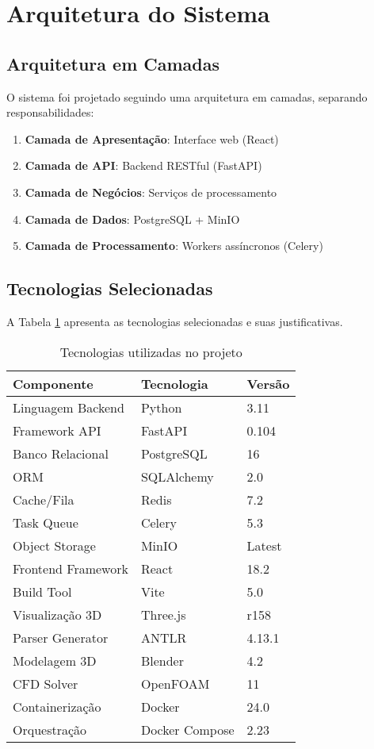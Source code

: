 \section{Arquitetura do Sistema}

\subsection{Arquitetura em Camadas}

O sistema foi projetado seguindo uma arquitetura em camadas, separando responsabilidades:

\begin{enumerate}
    \item \textbf{Camada de Apresentação}: Interface web (React)
    \item \textbf{Camada de API}: Backend RESTful (FastAPI)
    \item \textbf{Camada de Negócios}: Serviços de processamento
    \item \textbf{Camada de Dados}: PostgreSQL + MinIO
    \item \textbf{Camada de Processamento}: Workers assíncronos (Celery)
\end{enumerate}

\subsection{Tecnologias Selecionadas}

A Tabela \ref{tab:tecnologias} apresenta as tecnologias selecionadas e suas justificativas.

\begin{table}[htb]
\centering
\caption{Tecnologias utilizadas no projeto}
\label{tab:tecnologias}
\begin{tabular}{lll}
\toprule
\textbf{Componente} & \textbf{Tecnologia} & \textbf{Versão} \\
\midrule
Linguagem Backend & Python & 3.11 \\
Framework API & FastAPI & 0.104 \\
Banco Relacional & PostgreSQL & 16 \\
ORM & SQLAlchemy & 2.0 \\
Cache/Fila & Redis & 7.2 \\
Task Queue & Celery & 5.3 \\
Object Storage & MinIO & Latest \\
Frontend Framework & React & 18.2 \\
Build Tool & Vite & 5.0 \\
Visualização 3D & Three.js & r158 \\
Parser Generator & ANTLR & 4.13.1 \\
Modelagem 3D & Blender & 4.2 \\
CFD Solver & OpenFOAM & 11 \\
Containerização & Docker & 24.0 \\
Orquestração & Docker Compose & 2.23 \\
\bottomrule
\end{tabular}
\end{table}

